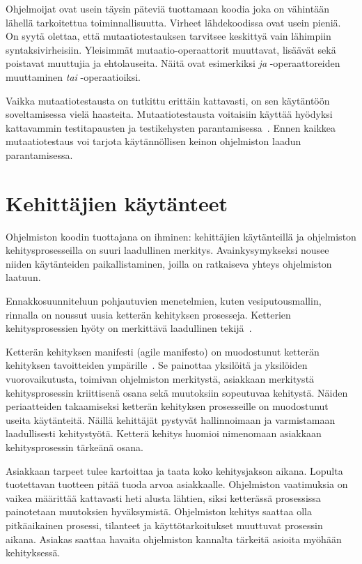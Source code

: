 \documentclass[finnish]{../tktltiki2}
\theoremstyle{definition}
\theoremstyle{remark}
\begin{document}
    Ohjelmoijat ovat usein täysin päteviä tuottamaan koodia joka on vähintään lähellä tarkoitettua toiminnallisuutta. 
Virheet lähdekoodissa ovat usein pieniä. On syytä olettaa, että mutaatiotestauksen tarvitsee keskittyä vain lähimpiin 
syntaksivirheisiin. Yleisimmät mutaatio-operaattorit muuttavat, lisäävät sekä poistavat muuttujia ja ehtolauseita. Näitä 
ovat esimerkiksi \emph{ja} -operaattoreiden muuttaminen \emph{tai} -operaatioiksi.

Vaikka mutaatiotestausta on tutkittu erittäin kattavasti, on sen käytäntöön soveltamisessa vielä haasteita. 
Mutaatiotestausta voitaisiin käyttää hyödyksi kattavammin testitapausten ja testikehysten parantamisessa~\cite{YH11}. 
Ennen kaikkea mutaatiotestaus voi tarjota käytännöllisen keinon ohjelmiston laadun parantamisessa.

\section{Kehittäjien käytänteet}

Ohjelmiston koodin tuottajana on ihminen: kehittäjien käytänteillä ja ohjelmiston kehitysprosesseilla on suuri 
laadullinen merkitys. Avainkysymykseksi nousee niiden käytänteiden paikallistaminen, joilla on ratkaiseva yhteys 
ohjelmiston laatuun.

    Ennakkosuunniteluun pohjautuvien menetelmien, kuten vesiputousmallin, rinnalla on noussut uusia ketterän kehityksen 
prosesseja. Ketterien kehitysprosessien hyöty on merkittävä laadullinen tekijä~\cite{SS10}.

    Ketterän kehityksen manifesti (agile manifesto) on muodostunut ketterän kehityksen tavoitteiden 
ympärille~\cite{BBB01}. Se painottaa yksilöitä ja yksilöiden vuorovaikutusta, toimivan ohjelmiston merkitystä, asiakkaan 
merkitystä kehitysprosessin kriittisenä osana sekä muutoksiin sopeutuvaa kehitystä. Näiden periaatteiden takaamiseksi 
ketterän kehityksen prosesseille on muodostunut useita käytänteitä. Näillä kehittäjät pystyvät hallinnoimaan ja 
varmistamaan laadullisesti kehitystyötä. Ketterä kehitys huomioi nimenomaan asiakkaan kehitysprosessin tärkeänä osana.

    Asiakkaan tarpeet tulee kartoittaa ja taata koko kehitysjakson aikana. Lopulta tuotettavan tuotteen pitää tuoda 
arvoa asiakkaalle. Ohjelmiston vaatimuksia on vaikea määrittää kattavasti heti alusta lähtien, siksi ketterässä 
prosessissa painotetaan muutoksien hyväksymistä. Ohjelmiston kehitys saattaa olla pitkäaikainen prosessi, tilanteet ja 
käyttötarkoitukset muuttuvat prosessin aikana. Asiakas saattaa havaita ohjelmiston kannalta tärkeitä asioita myöhään 
kehityksessä.
\end{document}
